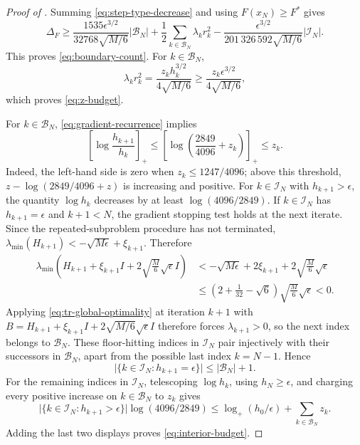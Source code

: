 \documentclass{article}
\begin{document}
\begin{proof}[Proof of ]
Summing \eqref{eq:step-type-decrease} and using
$F(x_N)\ge F^*$ gives
\[
  \Delta_F
  \ge\frac{1535\epsilon^{3/2}}{32768\sqrt{M/6}}
       |\mathcal B_N|
    +\frac12\sum_{k\in\mathcal B_N}\lambda_kr_k^2
    -\frac{\epsilon^{3/2}}{201\,326\,592\sqrt{M/6}}
       |\mathcal I_N|.
\]
This proves \eqref{eq:boundary-count}.  For $k\in\mathcal B_N$,
\[
  \lambda_kr_k^2
  =\frac{z_kh_k^{3/2}}{4\sqrt{M/6}}
  \ge\frac{z_k\epsilon^{3/2}}{4\sqrt{M/6}},
\]
which proves \eqref{eq:z-budget}.

For $k\in\mathcal B_N$, \eqref{eq:gradient-recurrence} implies
\[
 \left[\log\frac{h_{k+1}}{h_k}\right]_+
 \le\left[\log\left(\frac{2849}{4096}+z_k\right)\right]_+
 \le z_k.
\]
Indeed, the left-hand side is zero when
$z_k\le1247/4096$; above this threshold,
$z-\log(2849/4096+z)$ is increasing and positive.
For $k\in\mathcal I_N$ with $h_{k+1}>\epsilon$, the quantity
$\log h_k$ decreases by at least $\log(4096/2849)$.  If
$k\in\mathcal I_N$ has
$h_{k+1}=\epsilon$ and $k+1<N$, the gradient stopping test holds at the
next iterate.  Since the repeated-subproblem procedure has not
terminated,
$\lambda_{\min}(H_{k+1})<-\sqrt{M\epsilon}+\xi_{k+1}$.  Therefore
\begin{align*}
 \lambda_{\min}\!\left(
 H_{k+1}+\xi_{k+1}I+2\sqrt{\frac M6}\sqrt\epsilon I\right)
 &< -\sqrt{M\epsilon}+2\xi_{k+1}
       +2\sqrt{\frac M6}\sqrt\epsilon\\
 &\le\left(2+\frac1{32}-\sqrt6\right)
       \sqrt{\frac M6}\sqrt\epsilon<0.
\end{align*}
Applying \eqref{eq:tr-global-optimality} at iteration $k+1$ with
$B=H_{k+1}+\xi_{k+1}I
+2\sqrt{M/6}\sqrt\epsilon I$ therefore forces
$\lambda_{k+1}>0$, so the next index belongs to $\mathcal B_N$.
These floor-hitting indices in
$\mathcal I_N$ pair injectively with their successors in
$\mathcal B_N$, apart from the possible last index $k=N-1$.  Hence
\[
 \bigl|\{k\in\mathcal I_N:h_{k+1}=\epsilon\}\bigr|
 \le|\mathcal B_N|+1.
\]
For the remaining indices in $\mathcal I_N$, telescoping $\log h_k$,
using $h_N\ge\epsilon$, and charging every positive increase on
$k\in\mathcal B_N$ to $z_k$ gives
\[
 \bigl|\{k\in\mathcal I_N:h_{k+1}>\epsilon\}\bigr|
 \log(4096/2849)
 \le\log_+(h_0/\epsilon)+\sum_{k\in\mathcal B_N}z_k.
\]
Adding the last two displays proves \eqref{eq:interior-budget}.
\end{proof}
\end{document}

